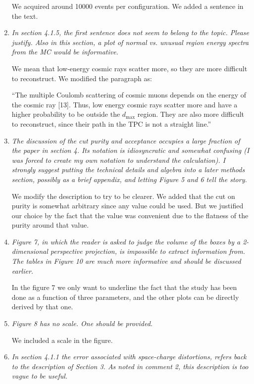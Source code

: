 \documentclass[review,number,sort&compress]{article}
\begin{document}
\begin{enumerate}
We acquired around 10000 events per configuration. We added a sentence in the text.


\item \emph{In section 4.1.5, the first sentence does not seem to belong to the topic. Please justify. Also in this section, a plot of normal vs. unusual region energy spectra from the MC would be informative.}

We mean that low-energy cosmic rays scatter more, so they are more difficult to reconstruct. We modified the paragraph as:

``The multiple Coulomb scattering of cosmic muons depends on the energy of the cosmic ray [13]. Thus, low energy cosmic rays scatter more and have a higher probability to be outside the $d_{\mathrm{max}}$ region. They are also more difficult to reconstruct, since their path in the TPC is not a straight line.''

\item \emph{The discussion of the cut purity and acceptance occupies a large fraction of the paper in section 4. Its notation is idiosyncratic and somewhat confusing (I was forced to create my own notation to understand the calculation). I strongly suggest putting the technical details and algebra into a later methods section, possibly as a brief appendix, and letting Figure 5 and 6 tell the story.}

We modify the description to try to be clearer. We added that the cut on purity is somewhat arbitrary since any value could be used. But we justified our choice by the fact that the value was convenient due to the flatness of the purity around that value.

\item \emph{Figure 7, in which the reader is asked to judge the volume of the boxes by a 2-dimensional perspective projection, is impossible to extract information from. The tables in Figure 10 are much more informative and should be discussed earlier.}

In the figure 7 we only want to underline the fact that the study has been done as a function of three parameters, and the other plots can be directly derived by that one.

\item \emph{Figure 8 has no scale. One should be provided.}

We included a scale in the figure.

\item \emph{In section 4.1.1 the error associated with space-charge distortions, refers back to the description of Section 3. As noted in comment 2, this description is too vague to be useful.}


\end{enumerate}
\end{document}
